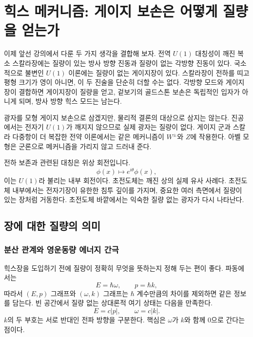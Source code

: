 \chapter{힉스 메커니즘: 게이지 보손은 어떻게 질량을 얻는가}

이제 앞선 강의에서 다룬 두 가지 생각을 결합해 보자. 전역 \(U(1)\) 대칭성이 깨진 복소 스칼라장에는 질량이 있는 방사 방향 진동과 질량이 없는 각방향 진동이 있다. 국소적으로 불변인 \(U(1)\) 이론에는 질량이 없는 게이지장이 있다. 스칼라장이 전하를 띠고 평형 크기가 영이 아니면, 이 두 진술을 단순히 더할 수는 없다. 각방향 모드와 게이지장이 결합하면 게이지장이 질량을 얻고, 겉보기의 골드스톤 보손은 독립적인 입자가 아니게 되며, 방사 방향 힉스 모드는 남는다.

광자를 모형 게이지 보손으로 삼겠지만, 물리적 결론의 대상으로 삼지는 않는다. 진공에서는 전자기 \(U(1)\)가 깨지지 않으므로 실제 광자는 질량이 없다. 게이지 군과 스칼라 다중항이 더 복잡한 전약 이론에서는 같은 메커니즘이 \(W^\pm\)와 \(Z\)에 작용한다. 아벨 모형은 군론으로 메커니즘을 가리지 않고 드러내 준다.

\begin{classroomqa}\end{classroomqa}

전하 보존과 관련된 대칭은 위상 회전입니다.
\begin{equation}
  \phi(x)\longmapsto e^{i\theta}\phi(x),
\end{equation}
이는 \(U(1)\)라 불리는 내부 회전이다. 초전도체는 깨진 상의 실제 유사 사례다. 초전도체 내부에서는 전자기장이 유한한 침투 깊이를 가지며, 중요한 여러 측면에서 질량이 있는 장처럼 거동한다. 초전도체 바깥에서는 익숙한 질량 없는 광자가 다시 나타난다.

\section{장에 대한 질량의 의미}

\subsection{분산 관계와 영운동량 에너지 간극}

힉스장을 도입하기 전에 질량이 정확히 무엇을 뜻하는지 정해 두는 편이 좋다. 파동에서는
\begin{equation}
  E=\hbar\omega,
  \qquad
  p=\hbar k,
  \label{eq:l08-quantum-wave}
\end{equation}
따라서 \((E,p)\) 그래프와 \((\omega,k)\) 그래프는 \(\hbar\) 계수만큼의 차이를 제외하면 같은 정보를 담는다. 빈 공간에서 질량 없는 상대론적 여기 상태는 다음을 만족한다.
\begin{equation}
  E=c|p|,
  \qquad
  \omega=c|k|.
  \label{eq:l08-massless-dispersion}
\end{equation}
\(k\)의 두 부호는 서로 반대인 전파 방향을 구분한다. 핵심은 \(\omega\)가 \(k\)와 함께 0으로 간다는 점이다.

